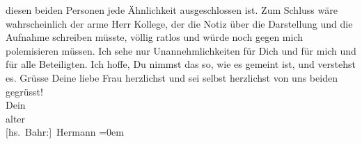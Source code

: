 \begin{ledgroupsized}[t]{13cm}
               diesen beiden Personen jede Ähnlichkeit ausgeschlossen ist. Zum Schluss wäre
               wahrscheinlich der arme Herr Kollege, der die Notiz über die Darstellung und die
               Aufnahme schreiben müsste, völlig ratlos und würde noch gegen mich polemisieren {\pb}müssen. Ich sehe nur Unannehmlichkeiten für Dich
               und für mich und für alle Beteiligten. Ich hoffe, Du nimmst das so, wie es gemeint
               ist, und verstehst es.\pend
           \pstart
           Grüsse Deine liebe Frau
               herzlichst und sei selbst herzlichst von uns beiden gegrüsst!{\\[\baselineskip]}Dein{\\[\baselineskip]}alter{\\[\baselineskip]}\spacefill\mbox{{[}hs. Bahr:{]} Hermann}\pend
           \leftskip=0em{}\endnumbering{}\end{ledgroupsized}  \newcommand{\dateiname}{L01980}\newcommand{\titel}{Hermann Bahr an Arthur Schnitzler, 15. 11. 1910}\newcommand{\editorInnen}{ Kurt Ifkovits,  Martin Anton Müller}
      